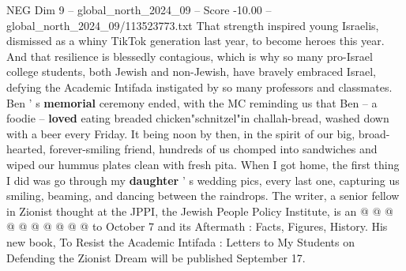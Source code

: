 \begin{textsample}{NEG Dim 9 – global\_north\_2024\_09 – Score -10.00 – global\_north\_2024\_09/113523773.txt}
That strength inspired young Israelis, dismissed as a whiny TikTok generation last year, to become heroes this year.
And that resilience is blessedly contagious, which is why so many pro-Israel college students, both Jewish and non-Jewish, have bravely embraced Israel, defying the Academic Intifada instigated by so many professors and classmates.
Ben ' s \textbf{memorial} ceremony ended, with the MC reminding us that Ben -- a foodie -- \textbf{loved} eating breaded chicken"schnitzel"in challah-bread, washed down with a beer every Friday.
It being noon by then, in the spirit of our big, broad-hearted, forever-smiling friend, hundreds of us chomped into sandwiches and wiped our hummus plates clean with fresh pita.
When I got home, the first thing I did was go through my \textbf{daughter} ' s wedding pics, every last one, capturing us smiling, beaming, and dancing between the raindrops.
The writer, a senior fellow in Zionist thought at the JPPI, the Jewish People Policy Institute, is an @ @ @ @ @ @ @ @ @ @ to October 7 and its Aftermath : Facts, Figures, History.
His new book, To Resist the Academic Intifada : Letters to My Students on Defending the Zionist Dream will be published September 17.

\end{textsample}
